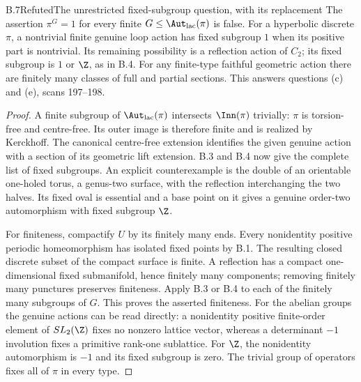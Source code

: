 \begin{claim}{B.7}{Refuted}{The unrestricted fixed-subgroup question, with its replacement}
The assertion $\pi^G=1$ for every finite $G\le\Aut_{\rm lac}(\pi)$ is false.
For a hyperbolic discrete $\pi$, a nontrivial finite genuine loop action has
fixed subgroup $1$ when its positive part is nontrivial. Its remaining possibility
is a reflection action of $C_2$; its fixed subgroup is $1$ or $\Z$, as in B.4.
For any finite-type faithful geometric action there are finitely many classes
of full and partial sections. This answers questions (c) and (e), scans 197--198.
\end{claim}
\begin{proof}
A finite subgroup of $\Aut_{\rm lac}(\pi)$ intersects $\Inn(\pi)$ trivially:
$\pi$ is torsion-free and centre-free. Its outer image is therefore finite and
is realized by Kerckhoff. The canonical centre-free extension identifies the
given genuine action with a section of its geometric lift extension. B.3 and
B.4 now give the complete list of fixed subgroups. An explicit counterexample
is the double of an orientable one-holed torus, a genus-two surface, with the
reflection interchanging the two halves. Its fixed oval is essential and a
base point on it gives a genuine order-two automorphism with fixed subgroup
$\Z$.

For finiteness, compactify $U$ by its finitely many ends. Every nonidentity
positive periodic homeomorphism has isolated fixed points by B.1. The resulting
closed discrete subset of the compact surface is finite. A reflection has a
compact one-dimensional fixed submanifold, hence finitely many components;
removing finitely many punctures preserves finiteness. Apply B.3 or B.4 to each
of the finitely many subgroups of $G$. This proves the asserted finiteness.
For the abelian groups the genuine actions can be read directly: a nonidentity
positive finite-order element of $SL_2(\Z)$ fixes no nonzero lattice vector,
whereas a determinant $-1$ involution fixes a primitive rank-one sublattice.
For $\Z$, the nonidentity automorphism is $-1$ and its fixed subgroup is zero.
The trivial group of operators fixes all of $\pi$ in every type.
\end{proof}

